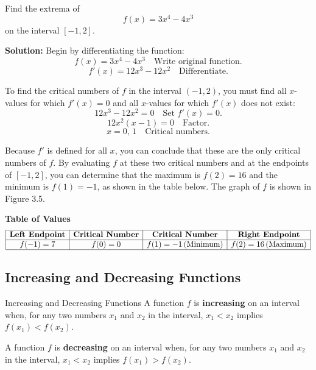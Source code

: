 \documentclass[12pt]{article}
\theoremstyle{beautifulthm}
\begin{document}
\begin{tcolorbox}[colback=examplebg, colframe=red!75!black, title=\textbf{EXAMPLE 2: Find the Extrema}, fonttitle=\bfseries, sharp corners]
Find the extrema of
\[
f(x) = 3x^4 - 4x^3
\]
on the interval \([-1, 2]\).

\tcblower
\textbf{Solution:} 
Begin by differentiating the function:
\[
f(x) = 3x^4 - 4x^3 \quad \text{Write original function.}
\]
\[
f'(x) = 12x^3 - 12x^2 \quad \text{Differentiate.}
\]

To find the critical numbers of \( f \) in the interval \((-1, 2)\), you must find all \( x \)-values for which \( f'(x) = 0 \) and all \( x \)-values for which \( f'(x) \) does not exist:
\[
12x^3 - 12x^2 = 0 \quad \text{Set } f'(x) = 0.
\]
\[
12x^2(x - 1) = 0 \quad \text{Factor.}
\]
\[
x = 0, \, 1 \quad \text{Critical numbers.}
\]

Because \( f' \) is defined for all \( x \), you can conclude that these are the only critical numbers of \( f \). By evaluating \( f \) at these two critical numbers and at the endpoints of \([-1, 2]\), you can determine that the maximum is \( f(2) = 16 \) and the minimum is \( f(1) = -1 \), as shown in the table below. The graph of \( f \) is shown in Figure 3.5.

\textbf{Table of Values}
\[
\begin{array}{|c|c|c|c|}
\hline
\textbf{Left Endpoint} & \textbf{Critical Number} & \textbf{Critical Number} & \textbf{Right Endpoint} \\
\hline
f(-1) = 7 & f(0) = 0 & f(1) = -1 \, \text{(Minimum)} & f(2) = 16 \, \text{(Maximum)} \\
\hline
\end{array}
\]
\end{tcolorbox}

\subsection{Increasing and Decreasing Functions}
\begin{Definition}{Increasing and Decreasing Functions}
 A function \( f \) is \textbf{increasing} on an interval when, for any two numbers \( x_1 \) and \( x_2 \) in the interval, \( x_1 < x_2 \) implies \( f(x_1) < f(x_2) \).

A function \( f \) is \textbf{decreasing} on an interval when, for any two numbers \( x_1 \) and \( x_2 \) in the interval, \( x_1 < x_2 \) implies \( f(x_1) > f(x_2) \).   
\end{Definition}
\end{document}
